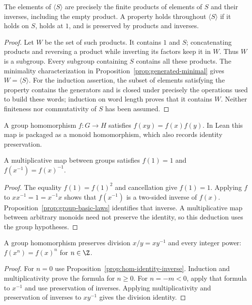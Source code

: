 \begin{proposition}\label{prop:generated-words}
The elements of $\langle S\rangle$ are precisely the finite products of elements of $S$ and their inverses, including the empty product. A property holds throughout $\langle S\rangle$ if it holds on $S$, holds at $1$, and is preserved by products and inverses.
\end{proposition}
\begin{proof}
Let $W$ be the set of such products. It contains $1$ and $S$; concatenating products and reversing a product while inverting its factors keep it in $W$. Thus $W$ is a subgroup. Every subgroup containing $S$ contains all these products. The minimality characterization in Proposition~\ref{prop:generated-minimal} gives $W=\langle S\rangle$. For the induction assertion, the subset of elements satisfying the property contains the generators and is closed under precisely the operations used to build these words; induction on word length proves that it contains $W$. Neither finiteness nor commutativity of $S$ has been assumed.
\end{proof}

\begin{definition}
A group homomorphism $f:G\to H$ satisfies $f(xy)=f(x)f(y)$. In Lean this map is packaged as a monoid homomorphism, which also records identity preservation.
\end{definition}
\begin{proposition}\label{prop:hom-identity-inverse}
A multiplicative map between groups satisfies $f(1)=1$ and $f(x^{-1})=f(x)^{-1}$.
\end{proposition}
\begin{proof}
The equality $f(1)=f(1)^2$ and cancellation give $f(1)=1$. Applying $f$ to $xx^{-1}=1=x^{-1}x$ shows that $f(x^{-1})$ is a two-sided inverse of $f(x)$. Proposition~\ref{prop:group-basic-laws} identifies that inverse. A multiplicative map between arbitrary monoids need not preserve the identity, so this deduction uses the group hypotheses.
\end{proof}

\begin{proposition}\label{prop:hom-powers}
A group homomorphism preserves division $x/y=xy^{-1}$ and every integer power: $f(x^n)=f(x)^n$ for $n\in\Z$.
\end{proposition}
\begin{proof}
For $n=0$ use Proposition~\ref{prop:hom-identity-inverse}. Induction and multiplicativity prove the formula for $n\geq0$. For $n=-m<0$, apply that formula to $x^{-1}$ and use preservation of inverses. Applying multiplicativity and preservation of inverses to $xy^{-1}$ gives the division identity.
\end{proof}

